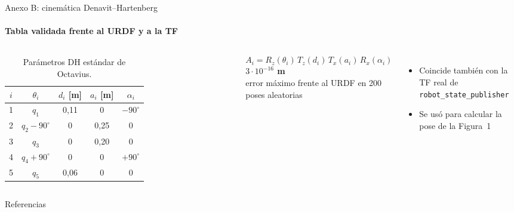 \begin{frame}{Anexo B: cinemática Denavit--Hartenberg}
  \framesubtitle{Tabla validada frente al URDF y a la TF}
  \begin{columns}[c, onlytextwidth]
    \begin{table}
      \centering
      \caption{Parámetros DH estándar de Octavius.}
      \scriptsize
      \begin{tabular}{@{} c c c c c @{}}
        \toprule
        $i$ & $\theta_i$ & $d_i$ [m] & $a_i$ [m] & $\alpha_i$ \\
        \midrule
        1 & $q_1$ & 0,11 & 0 & $-90^\circ$ \\
        2 & $q_2 - 90^\circ$ & 0 & 0,25 & 0 \\
        3 & $q_3$ & 0 & 0,20 & 0 \\
        4 & $q_4 + 90^\circ$ & 0 & 0 & $+90^\circ$ \\
        5 & $q_5$ & 0,06 & 0 & 0 \\
        \bottomrule
      \end{tabular}
    \end{table}
    \begin{equation}
      A_i = R_z(\theta_i)\,T_z(d_i)\,T_x(a_i)\,R_x(\alpha_i)
    \end{equation}
    \centering
    {\Huge\bfseries\color{tPrim} $3\cdot10^{-16}$ m}\\
    {\scriptsize error máximo frente al URDF en 200 poses aleatorias}
    \vfill
    \begin{itemize}
      \item Coincide también con la TF real de \texttt{robot\_state\_publisher}
      \item Se usó para calcular la pose de la Figura~1
    \end{itemize}
  \end{columns}
\end{frame}


\begin{frame}[allowframebreaks]{Referencias}
  \nocite{*}
  
  
\end{frame}
